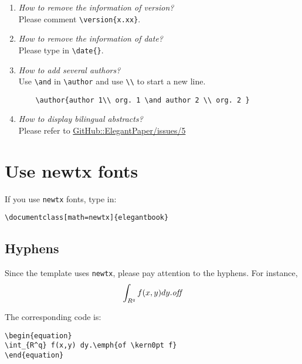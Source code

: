 \documentclass[11pt,en,cite=authoryear]{elegantpaper}
\begin{document}
\begin{enumerate}[label=\arabic*).]
	\item \textit{How to remove the information of version?}\\
    Please comment \lstinline|\version{x.xx}|.
	\item \textit{How to remove the information of date?}\\
	Please type in \lstinline|\date{}|.
	\item \textit{How to add several authors?}\\
	Use \lstinline{\and} in \lstinline{\author} and use \lstinline{\\} to start a new line.
	\begin{lstlisting}
	\author{author 1\\ org. 1 \and author 2 \\ org. 2 }
	\end{lstlisting}
	\item \textit{How to display bilingual abstracts?}\\
	Please refer to \href{https://github.com/ElegantLaTeX/ElegantPaper/issues/5}{GitHub::ElegantPaper/issues/5}
\end{enumerate}


\nocite{en1,en2}



\appendix
\addappheadtotoc


\section{Use newtx fonts}
If you use \lstinline{newtx} fonts, type in:

\begin{lstlisting}
\documentclass[math=newtx]{elegantbook}
\end{lstlisting}


\subsection{Hyphens}
Since the template uses \lstinline{newtx}, please pay attention to the hyphens. For instance,
\begin{equation}
\int_{R^q} f(x,y) dy.\emph{of\kern0pt f}
\end{equation}

The corresponding code is: 
\begin{lstlisting}
\begin{equation}
\int_{R^q} f(x,y) dy.\emph{of \kern0pt f}
\end{equation}
\end{lstlisting}
\end{document}
